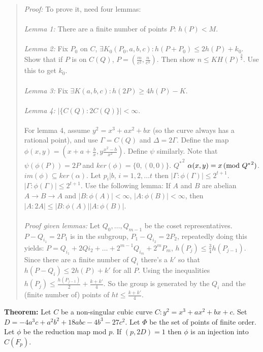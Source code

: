 \begin{quote}
\emph{Proof:} To prove it, need four lemmas:
\\
\\
\emph{Lemma 1:} There are a finite number of points $P$: $h(P) < M$.
\\
\\
\emph{Lemma 2:} Fix $P_0$ on $C$, $\exists K_0(P_0 , a, b, c):  h(P+P_0) \leq
2h(P)+ k_0$.
\\
\jt Show that if $P$ is on $C(Q)$, $P=({\frac m {e^2}}, {\frac n {e^3}})$.  Then
show $n \leq KH(P)^{\frac 3 2}$.  Use this to get
$k_0$.
\\
\\
\emph{Lemma 3:} Fix  $\exists K(a, b, c):  h(2P) \geq
4h(P) - K$.
\\
\\
\emph{Lemma 4:} $|\{C(Q):2C(Q)\}| < \infty$.
\\
\\
For lemma 4, assume $y^2= x^3+ax^2+bx$ (so the curve
always has a rational point), and use $\Gamma= C(Q)$ and
$\Delta=2\Gamma$.  Define the map
$\phi(x,y)= (x+a+{\frac b x}, y{\frac {x^2 - b} {x^2}})$.
Define $\psi$ similarly.  Note that $\psi ( \phi (P))= 2P$ and
$ker(\phi) = \{0, (0,0)\}$. ${Q^*}^2$ $\alpha(x,y)= x \thinspace \textnormal{(mod } {Q^*}^2 \textnormal{)}$.  $im(\phi) \subseteq ker(\alpha)$.
Let $p_i | b$, $i= 1,2, \ldots t$ then $|\Gamma: \phi(\Gamma)| \leq
2^{t+1}$.
$|\Gamma:\phi(\Gamma)| \leq 2^{t+1}$.  Use the following lemma: If $A$ and
$B$
are abelian $A \rightarrow B \rightarrow A$ and
$|B:\phi(A)| < \infty$,
$|A:\phi(B)| < \infty$, then $|A:2A| \leq
|B:\phi(A)| |A:\phi(B)|$.
\\
\\
\emph{Proof given lemmas:} Let $Q_0 , \ldots, Q_{m-1}$ be the coset
representatives.  $P-Q_{i_1}= 2P_1$ is in the subgroup, $P_1-Q_{i_2}= 2P_2$,
repeatedly doing this yields:
$P= Q_{i_1} + 2 Q{i_2} + \ldots + 2^{m-1}Q_{i_m} +
2^m P_m$, $h(P_j) \leq {\frac 3 4} h(P_{j-1})$.
Since there are a finite
number of $Q_i$ there's a $k'$ so that $h(P-Q_i) \leq 2 h(P) + k'$ for all
$P$.  Using the inequalities $h(P_j) \leq {\frac {h(P_{j-1})} 2} +
{\frac {k+k'} 4}$.
So the group is generated by the $Q_i$ and the (finite number
of) points of $ht \leq {\frac {k+k'} 4}$.
\end{quote}
{\bf Theorem:}
Let $C$ be a non-singular cubic curve $C: y^2= x^3 + ax^2 + bx +c$.  Set
$D= -4a^3 c + a^2 b^2 + 18 abc -4b^3 -27c^2$.  Let $\Phi$ be the set of
points of finite order.  Let $\phi$ be the reduction map mod $p$.  If
$(p, 2D)= 1$ then $\phi$ is an injection into $C(F_p )$.
